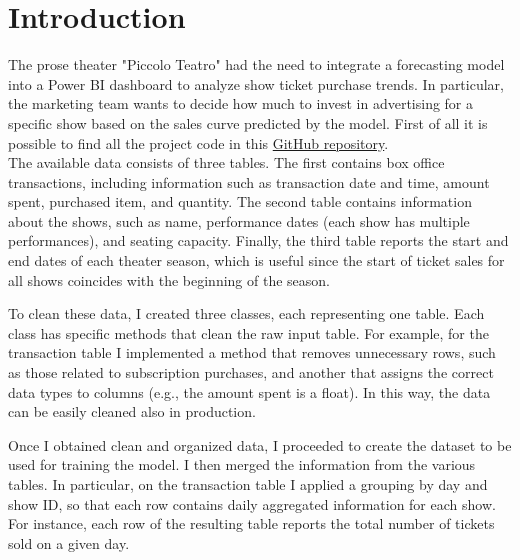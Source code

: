 \documentclass{Configuration_Files/PoliMi3i_thesis}
\begin{document}
\mainmatter %


\chapter{Introduction}
The prose theater "Piccolo Teatro" had the need to integrate a forecasting model into a Power BI dashboard to analyze show ticket purchase trends.
In particular, the marketing team wants to decide how much to invest in advertising for a specific show based on the sales curve predicted by the model.
First of all it is possible to find all the project code in this \href{https://github.com/SiniscalchiCarlo/piccolo_teatro}{GitHub repository}.
\\The available data consists of three tables.
The first contains box office transactions, including information such as transaction date and time, amount spent, purchased item, and quantity.
The second table contains information about the shows, such as name, performance dates (each show has multiple performances), and seating capacity.
Finally, the third table reports the start and end dates of each theater season, which is useful since the start of ticket sales for all shows coincides with the beginning of the season.

To clean these data, I created three classes, each representing one table. Each class has specific methods that clean the raw input table.
For example, for the transaction table I implemented a method that removes unnecessary rows, such as those related to subscription purchases, and another that assigns the correct data types to columns (e.g., the amount spent is a float). In this way, the data can be easily cleaned also in production.

Once I obtained clean and organized data, I proceeded to create the dataset to be used for training the model.
I then merged the information from the various tables. In particular, on the transaction table I applied a grouping by day and show ID, so that each row contains daily aggregated information for each show. For instance, each row of the resulting table reports the total number of tickets sold on a given day.
\end{document}
